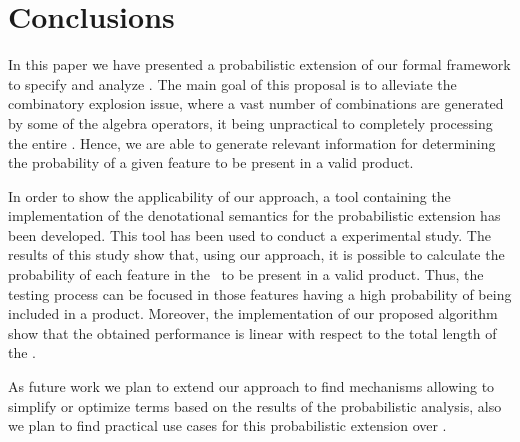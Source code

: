 \section{Conclusions}
\label{section:jstat:concs}

In this paper we have presented a probabilistic extension of our 
formal framework to specify and analyze \SPLs. The main goal of this 
proposal is to alleviate the combinatory explosion issue, where a vast
number of combinations are generated by some of the algebra operators,
it being unpractical to completely processing the entire \SPL. Hence, we
are able to generate relevant information for determining the probability 
of a given feature to be present in a valid product.

In order to show the applicability of our approach, a tool containing the 
implementation of the denotational semantics for the probabilistic extension
has been developed. This tool has been used to conduct a experimental study.
%
The results of this study show that, using our approach, it is possible to calculate 
the probability of each feature in the \SPL\ to be present in a valid product. 
Thus, the testing process can be focused in those features having a high probability 
of being included in a product. Moreover, the implementation of our proposed algorithm
show that the obtained performance is linear with respect to the total
length of the \SPL.

%
%
%
%
As future work we plan to extend our approach%
to find mechanisms allowing to simplify or optimize terms
based on the results of the probabilistic analysis, also
we plan to find practical use cases for this probabilistic
extension over \SPLs.



